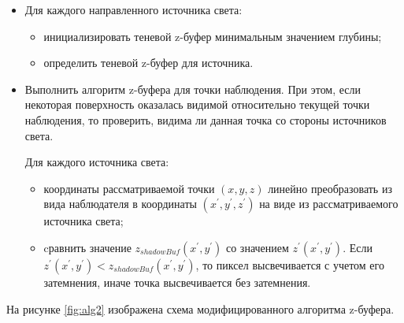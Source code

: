\documentclass[a4paper,14pt, unknownkeysallowed]{extreport}
\begin{document}
\begin{itemize}
	\item Для каждого направленного источника света:
	
	\begin{itemize}
		\item инициализировать теневой z-буфер минимальным значением глубины;
		\item определить теневой z-буфер для источника.
	\end{itemize}

	\item Выполнить алгоритм z-буфера для точки наблюдения. При этом, если некоторая поверхность оказалась видимой относительно текущей точки наблюдения, то проверить, видима ли данная точка со стороны источников света.
	
	Для каждого источника света:
	\begin{itemize}
		\item координаты рассматриваемой точки $(x, y, z)$ линейно преобразовать из вида наблюдателя в координаты $(x^\prime, y^\prime, z^\prime)$ на виде из рассматриваемого источника света;
		\item cравнить значение $z_{shadowBuf} (x^\prime, y^\prime)$ со значением $z^\prime(x^\prime, y^\prime)$. Если\linebreak $z^\prime(x^\prime, y^\prime) < z_{shadowBuf} (x^\prime, y^\prime)$, то пиксел высвечивается с учетом его затемнения, иначе точка высвечивается без затемнения.
	\end{itemize}
\end{itemize}

На рисунке \ref{fig:alg2} изображена схема модифицированного алгоритма z-буфера.
\end{document}

